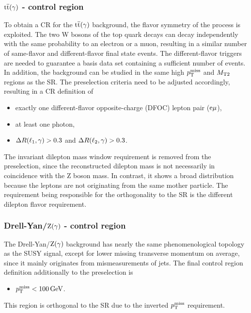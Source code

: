 \subsubsection*{${\mathrm{t}\overline{\mathrm{t}}}(\gamma)$ - control region}
To obtain a CR for the ${\mathrm{t}\overline{\mathrm{t}}}(\gamma)$ background, the flavor symmetry of the process is exploited. The two W bosons of the top quark decays can decay independently with the same probability to an electron or a muon, resulting in a similar number of same-flavor and different-flavor final state events. The different-flavor triggers are needed to guarantee a basis data set containing a sufficient number of events. In addition, the background can be studied in the same high $p_{\mathrm{T}}^\text{miss}$ and $M_{\mathrm{T2}}$ regions as the SR. The preselection criteria need to be adjusted accordingly, resulting in a CR definition of
\begin{itemize}
 \item exactly one different-flavor opposite-charge (DFOC) lepton pair ($\mathrm{e}{\mu}$),
 \item at least one photon,
 \item $\Delta R(\ell_1,\gamma)>0.3$ and $\Delta R(\ell_2,\gamma)>0.3$.
\end{itemize}
The invariant dilepton mass window requirement is removed from the preselection, since the reconstructed dilepton mass is not necessarily in coincidence with the Z boson mass. In contrast, it shows a broad distribution because the leptons are not originating from the same mother particle. The requirement being responsible for the orthogonality to the SR is the different dilepton flavor requirement.
\subsubsection*{Drell-Yan/$\mathrm{Z}(\gamma)$ - control region}
The Drell-Yan/$\mathrm{Z}(\gamma)$ background has nearly the same phenomenological topology as the SUSY signal, except for lower missing transverse momentum on average, since it mainly originates from mismeasurements of jets. The final control region definition additionally to the preselection is
\begin{itemize}
 \item $p_{\mathrm{T}}^\text{miss}<100\,\text{Ge\hspace{-.08em}V}$.
\end{itemize}
This region is orthogonal to the SR due to the inverted $p_{\mathrm{T}}^\text{miss}$ requirement.

